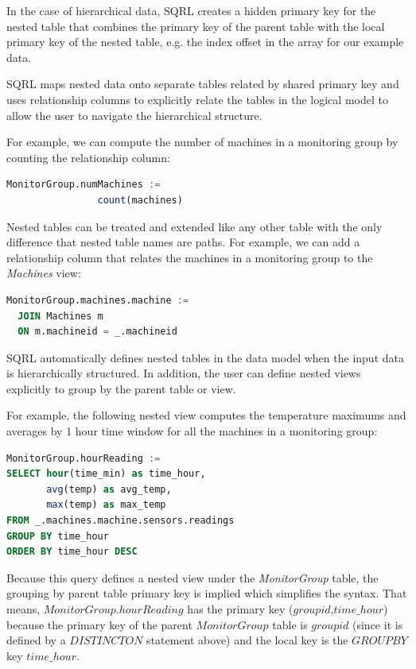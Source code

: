 \documentclass[	DIV=calc,%
							paper=letter,%
							fontsize=11pt,%
							twocolumn]{scrartcl}	 					%
\begin{document}
In the case of hierarchical data, SQRL creates a hidden primary key for the nested table that combines the primary key of the parent table with the local primary key of the nested table, e.g. the index offset in the array for our example data.

SQRL maps nested data onto separate tables related by shared primary key and uses relationship columns to explicitly relate the tables in the logical model to allow the user to navigate the hierarchical structure.

For example, we can compute the number of machines in a monitoring group by counting the relationship column:
\begin{lstlisting}[language=SQL]
MonitorGroup.numMachines :=
                count(machines)
\end{lstlisting}

Nested tables can be treated and extended like any other table with the only difference that nested table names are paths. For example, we can add a relationship column that relates the machines in a monitoring group to the \emph{Machines} view:
\begin{lstlisting}[language=SQL]
MonitorGroup.machines.machine :=
  JOIN Machines m
  ON m.machineid = _.machineid
\end{lstlisting}

SQRL automatically defines nested tables in the data model when the input data is hierarchically structured. In addition, the user can define nested views explicitly to group by the parent table or view.

For example, the following nested view computes the temperature maximums and averages by 1 hour time window for all the machines in a monitoring group:
\begin{lstlisting}[language=SQL]
MonitorGroup.hourReading :=
SELECT hour(time_min) as time_hour,
       avg(temp) as avg_temp,
       max(temp) as max_temp
FROM _.machines.machine.sensors.readings
GROUP BY time_hour
ORDER BY time_hour DESC
\end{lstlisting}

Because this query defines a nested view under the \emph{MonitorGroup} table, the grouping by parent table primary key is implied which simplifies the syntax. That means, $MonitorGroup.hourReading$ has the primary key ($groupid$,$time\_hour$) because the primary key of the parent $MonitorGroup$ table is $groupid$ (since it is defined by a $DISTINCT ON$ statement above) and the local key is the $GROUP BY$ key $time\_hour$.
\end{document}
